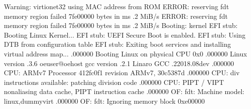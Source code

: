 \documentclass[a4paper,10pt,oneside,english]{sphinxmanual}
\begin{document}
\begin{sphinxVerbatim}[commandchars=\\\{\}]
Warning: virtio\PYGZhy{}net\PYGZsh{}32 using MAC address from ROM
ERROR: reserving fdt memory region failed 7fe00000 
 bytes  in  ms .2 MiB/s
ERROR: reserving fdt memory region failed 7fe00000 
 bytes  in  ms .2 MiB/s
Booting: kernel
EFI stub: Booting Linux Kernel...
EFI stub: UEFI Secure Boot is enabled.
EFI stub: Using DTB from configuration table
EFI stub: Exiting boot services and installing virtual address map...
\PYG{o}{[}    .000000\PYG{o}{]} Booting Linux on physical CPU 0x0
\PYG{o}{[}    .000000\PYG{o}{]} Linux version .3.6 oe\PYGZhy{}user@oe\PYGZhy{}host gcc version .2.1  Linaro GCC .2\PYGZhy{}2018.08\PYGZti{}dev 
\PYG{o}{[}    .000000\PYG{o}{]} CPU: ARMv7 Processor \PYG{o}{[}412fc0f1\PYG{o}{]} revision  ARMv7, 30c5387d
\PYG{o}{[}    .000000\PYG{o}{]} CPU: div instructions available: patching division code
\PYG{o}{[}    .000000\PYG{o}{]} CPU: PIPT / VIPT nonaliasing data cache, PIPT instruction cache
\PYG{o}{[}    .000000\PYG{o}{]} OF: fdt: Machine model: linux,dummy\PYGZhy{}virt
\PYG{o}{[}    .000000\PYG{o}{]} OF: fdt: Ignoring memory block 0xe00000
\end{sphinxVerbatim}
\end{document}
